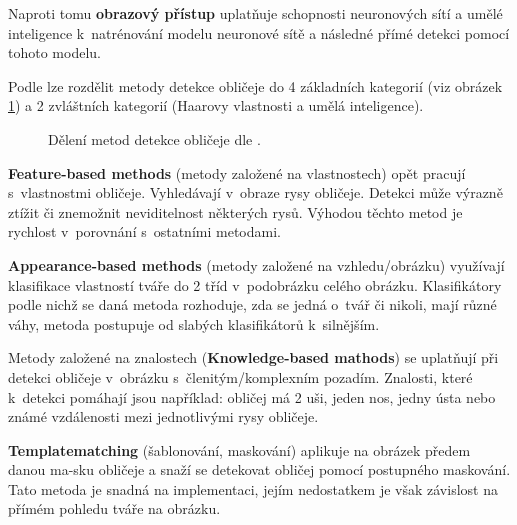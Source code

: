 Naproti tomu \textbf{obrazový přístup} uplatňuje schopnosti neuronových sítí a umělé inteligence k~natrénování modelu neuronové sítě a následné přímé detekci pomocí tohoto modelu. 

Podle \cite{feature-based-fd-review} lze rozdělit metody detekce obličeje do 4 základních kategorií (viz obrázek \ref{fddeleni}) a 2 zvláštních kategorií (Haarovy vlastnosti a umělá inteligence).
\begin{figure}[H]
  \begin{center}
  \label{fddeleni}
  \caption{Dělení metod detekce obličeje dle \cite{feature-based-fd-review}.}
  \end{center}
\end{figure}

\textbf{Feature-based methods} (metody založené na vlastnostech) opět pracují s~vlastnostmi obličeje. Vyhledávají v~obraze rysy obličeje. Detekci může výrazně ztížit či znemožnit neviditelnost některých rysů. Výhodou těchto metod je rychlost v~porovnání s~ostatními metodami.

\textbf{Appearance-based methods} (metody založené na vzhledu/obrázku) využívají klasifikace vlastností tváře do 2 tříd v~podobrázku celého obrázku. Klasifikátory podle nichž se daná metoda rozhoduje, zda se jedná o~tvář či nikoli, mají různé váhy, metoda postupuje od slabých klasifikátorů k~silnějším.

Metody založené na znalostech (\textbf{Knowledge-based mathods}) se uplatňují při detekci obličeje v~obrázku s~členitým/komplexním pozadím. Znalosti, které k~detekci pomáhají jsou například: obličej má 2 uši, jeden nos, jedny ústa nebo známé vzdálenosti mezi jednotlivými rysy obličeje.

\textbf{Templatematching} (šablonování, maskování) aplikuje na obrázek předem danou ma-sku obličeje a snaží se detekovat obličej pomocí postupného maskování. Tato metoda je snadná na implementaci, jejím nedostatkem je však závislost na přímém pohledu tváře na obrázku.

